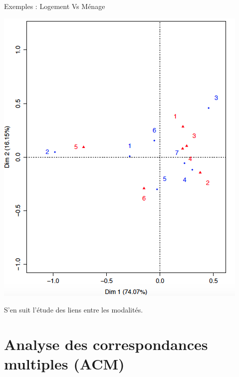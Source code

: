 \documentclass[10pt]{beamer}
\begin{document}
\begin{frame}{Exemples : Logement Vs Ménage}
\centering 

\includegraphics[scale=.4]{CNLAFC} 



S'en suit l'étude des liens entre les modalités.
\end{frame}


\section{Analyse des correspondances multiples (ACM)}
\end{document}
